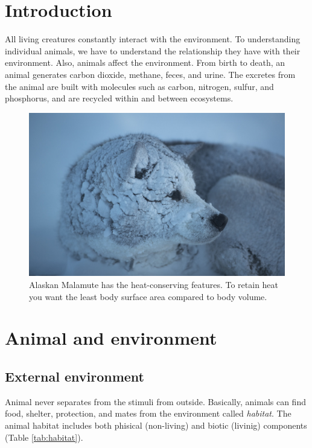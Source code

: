 \documentclass[]{book}
\begin{document}
\chapter{Introduction}\label{intro}

All living creatures constantly interact with the environment. To
understanding individual animals, we have to understand the relationship
they have with their environment. Also, animals affect the environment.
From birth to death, an animal generates carbon dioxide, methane, feces,
and urine. The excretes from the animal are built with molecules such as
carbon, nitrogen, sulfur, and phosphorus, and are recycled within and
between ecosystems.

\begin{figure}

{\centering \includegraphics[width=1\linewidth]{figures/polar} 

}

\caption{Alaskan Malamute has the heat-conserving features. To retain heat you want the least body surface area compared to body volume.}\label{fig:snow-dog}
\end{figure}

\chapter{Animal and environment}\label{chapter2}

\section{External environment}\label{external-environment}

Animal never separates from the stimuli from outside. Basically, animals
can find food, shelter, protection, and mates from the environment
called \emph{habitat}. The animal habitat includes both phisical
(non-living) and biotic (livinig) components (Table \ref{tab:habitat}).
\end{document}
